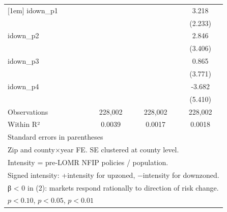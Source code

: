\begin{table}[htbp]
\begin{tabular}{l*{3}{c}}
[1em]
idown\_p1            &                     &                     &       3.218         \\
                    &                     &                     &     (2.233)         \\
[1em]
idown\_p2            &                     &                     &       2.846         \\
                    &                     &                     &     (3.406)         \\
[1em]
idown\_p3            &                     &                     &       0.865         \\
                    &                     &                     &     (3.771)         \\
[1em]
idown\_p4            &                     &                     &      -3.682         \\
                    &                     &                     &     (5.410)         \\
\hline
Observations        &     228,002         &     228,002         &     228,002         \\
Within R²           &      0.0039         &      0.0017         &      0.0018         \\
\hline\hline
\multicolumn{4}{l}{\footnotesize Standard errors in parentheses}\\
\multicolumn{4}{l}{\footnotesize Zip and county×year FE. SE clustered at county level.}\\
\multicolumn{4}{l}{\footnotesize Intensity = pre-LOMR NFIP policies / population.}\\
\multicolumn{4}{l}{\footnotesize Signed intensity: +intensity for upzoned, −intensity for downzoned.}\\
\multicolumn{4}{l}{\footnotesize β < 0 in (2): markets respond rationally to direction of risk change.}\\
\multicolumn{4}{l}{\footnotesize \sym{*} \(p<0.10\), \sym{**} \(p<0.05\), \sym{***} \(p<0.01\)}\\
\end{tabular}
\end{table}
